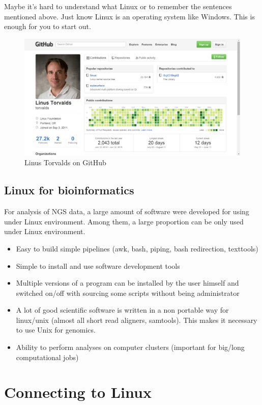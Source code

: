\documentclass[]{book}
\providecommand{\tightlist}{%
  \setlength{\itemsep}{0pt}\setlength{\parskip}{0pt}}
\theoremstyle{definition}
\theoremstyle{definition}
\theoremstyle{definition}
\theoremstyle{remark}
\begin{document}
Maybe it's hard to understand what Linux or to remember the sentences
mentioned above. Just know Linux is an operating system like Windows.
This is enough for you to start out.

\begin{figure}

{\centering \includegraphics[width=0.5\linewidth]{figures/Linus_Torvalds_GitHub} 

}

\caption{Linus Torvalds on GitHub}\label{fig:LinusTorvaldsGitHub}
\end{figure}

\section{Linux for bioinformatics}\label{linux-for-bioinformatics}

For analysis of NGS data, a large amount of software were developed for
using under Linux environment. Among them, a large proportion can be
only used under Linux environment.

\begin{itemize}
\tightlist
\item
  Easy to build simple pipelines (awk, bash, piping, bash redirection,
  texttools)
\item
  Simple to install and use software development tools
\item
  Multiple versions of a program can be installed by the user himself
  and switched on/off with sourcing some scripts without being
  administrator
\item
  A lot of good scientific software is written in a non portable way for
  linux/unix (almost all short read aligners, samtools). This makes it
  necessary to use Unix for genomics.
\item
  Ability to perform analyses on computer clusters (important for
  big/long computational jobs)
\end{itemize}

\chapter{Connecting to Linux}\label{connecting-to-linux}
\end{document}
